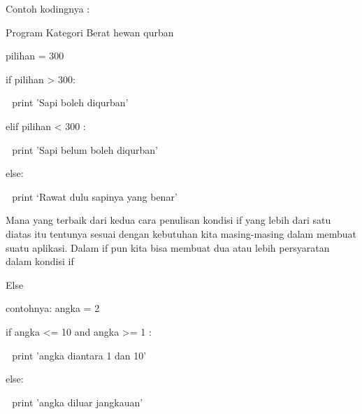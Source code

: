 Contoh kodingnya : \par
\noindent 
\vspace{\baselineskip}
Program Kategori Berat hewan qurban \par
\noindent 
\vspace{\baselineskip}
pilihan = 300 \par
\noindent 
\vspace{\baselineskip}
if pilihan > 300: \par
\noindent 
\vspace{\baselineskip}
 $  $  $  $ print 'Sapi boleh diqurban' \par
\noindent 
\vspace{\baselineskip}
elif pilihan <  $  $300 : \par
\noindent 
\vspace{\baselineskip}
 $  $  $  $ print 'Sapi belum boleh diqurban' \par
\noindent 
\vspace{\baselineskip}
else: \par
\noindent 
\vspace{\baselineskip}
 $  $  $  $ print ‘Rawat dulu sapinya yang benar' \par
\noindent 
\vspace{\baselineskip}
Mana yang terbaik dari kedua cara penulisan kondisi if yang lebih dari satu diatas itu tentunya sesuai dengan kebutuhan kita masing-masing dalam membuat suatu aplikasi. Dalam if pun kita bisa membuat dua atau lebih persyaratan dalam kondisi if \par
\noindent 
\vspace{\baselineskip}
\vspace{\baselineskip}
Else \par
\noindent 
\vspace{\baselineskip}
contohnya:\vspace{\baselineskip}
angka = 2 \par
\noindent 
\vspace{\baselineskip}
if angka <= 10 and angka >= 1 : \par
\noindent 
\vspace{\baselineskip}
 $  $  $  $ print 'angka diantara 1 dan 10' \par
\noindent 
\vspace{\baselineskip}
else: \par
\noindent 
\vspace{\baselineskip}
 $  $  $  $ print 'angka diluar jangkauan' \par
